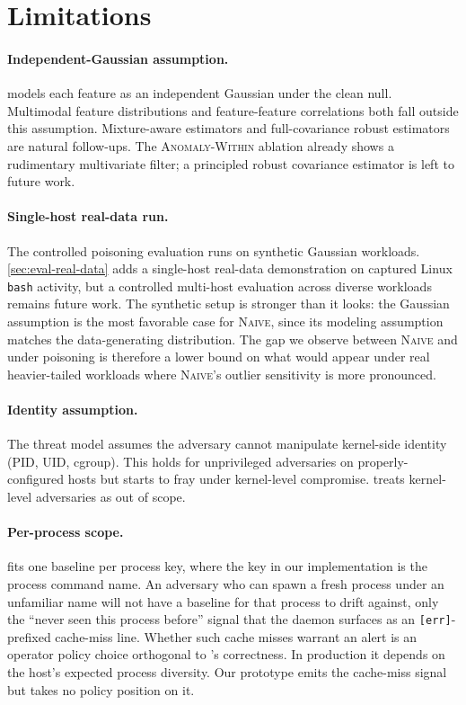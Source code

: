 \section{Limitations}
\label{sec:limitations}

\paragraph{Independent-Gaussian assumption.}
\sediment{} models each feature as an independent Gaussian under the
clean null. Multimodal feature distributions and feature-feature
correlations both fall outside this assumption. Mixture-aware
estimators and full-covariance robust estimators are natural
follow-ups. The \textsc{Anomaly-Within} ablation already shows a
rudimentary multivariate filter; a principled robust covariance
estimator is left to future work.

\paragraph{Single-host real-data run.}
The controlled poisoning evaluation runs on synthetic Gaussian
workloads. \cref{sec:eval-real-data} adds a single-host real-data
demonstration on captured Linux \texttt{bash} activity, but a
controlled multi-host evaluation across diverse workloads remains
future work. The synthetic setup is stronger than it looks: the
Gaussian assumption is the most favorable case for \textsc{Naive},
since its modeling assumption matches the data-generating
distribution. The gap we observe between \textsc{Naive} and
\sediment{} under poisoning is therefore a lower bound on what
would appear under real heavier-tailed workloads where \textsc{Naive}'s
outlier sensitivity is more pronounced.

\paragraph{Identity assumption.}
The threat model assumes the adversary cannot manipulate kernel-side
identity (PID, UID, cgroup). This holds for unprivileged adversaries
on properly-configured hosts but starts to fray under kernel-level
compromise. \chronosynd{} treats kernel-level adversaries as out of
scope.

\paragraph{Per-process scope.}
\sediment{} fits one baseline per process key, where the key in our
implementation is the process command name. An adversary who can
spawn a fresh process under an unfamiliar name will not have a
baseline for that process to drift against, only the ``never seen
this process before'' signal that the daemon surfaces as an
\texttt{[err]}-prefixed cache-miss line. Whether such cache misses
warrant an alert is an operator policy choice orthogonal to
\sediment{}'s correctness. In production it depends on the host's
expected process diversity. Our prototype emits the cache-miss
signal but takes no policy position on it.

